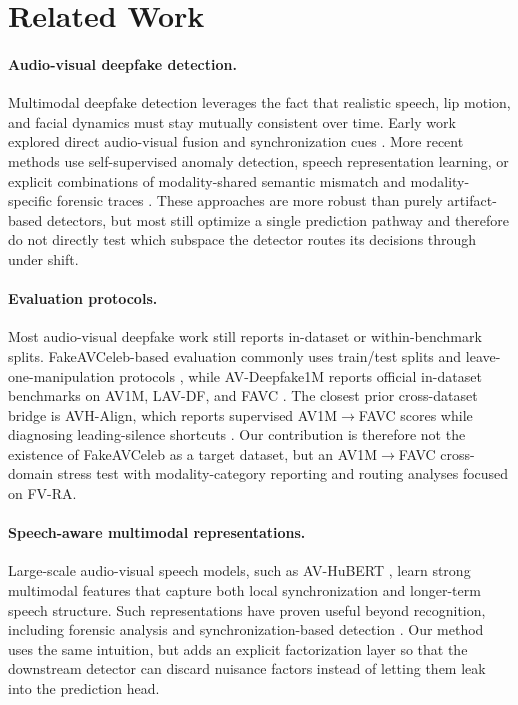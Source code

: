 \documentclass{article}
\begin{document}
\section{Related Work}

\paragraph{Audio-visual deepfake detection.}
Multimodal deepfake detection leverages the fact that realistic speech, lip motion, and facial dynamics must stay mutually consistent over time. Early work explored direct audio-visual fusion and synchronization cues \citep{zhou2021jointav, chung2016syncnet}. More recent methods use self-supervised anomaly detection, speech representation learning, or explicit combinations of modality-shared semantic mismatch and modality-specific forensic traces \citep{feng2023avad, liang2024speechforensics, smeu2025avhalign, du2025cad}. These approaches are more robust than purely artifact-based detectors, but most still optimize a single prediction pathway and therefore do not directly test which subspace the detector routes its decisions through under shift.

\paragraph{Evaluation protocols.}
Most audio-visual deepfake work still reports in-dataset or within-benchmark splits. FakeAVCeleb-based evaluation commonly uses train/test splits and leave-one-manipulation protocols \citep{feng2023avad, oorloff2024avff}, while AV-Deepfake1M reports official in-dataset benchmarks on AV1M, LAV-DF, and FAVC \citep{cai2024avdeepfake1m}. The closest prior cross-dataset bridge is AVH-Align, which reports supervised AV1M$\rightarrow$FAVC scores while diagnosing leading-silence shortcuts \citep{smeu2025avhalign}. Our contribution is therefore not the existence of FakeAVCeleb as a target dataset, but an AV1M$\rightarrow$FAVC cross-domain stress test with modality-category reporting and routing analyses focused on FV-RA.

\paragraph{Speech-aware multimodal representations.}
Large-scale audio-visual speech models, such as AV-HuBERT \citep{shi2022avhubert}, learn strong multimodal features that capture both local synchronization and longer-term speech structure. Such representations have proven useful beyond recognition, including forensic analysis and synchronization-based detection \citep{liang2024speechforensics, smeu2025avhalign}. Our method uses the same intuition, but adds an explicit factorization layer so that the downstream detector can discard nuisance factors instead of letting them leak into the prediction head.
\end{document}
